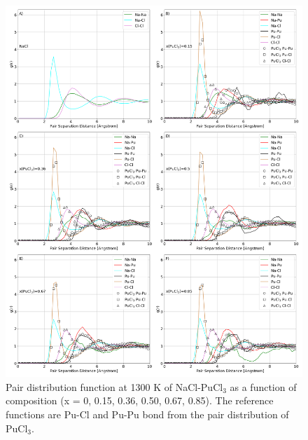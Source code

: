 \documentclass[review]{elsarticle}
\begin{document}
\begin{figure}[h!]
 \centering
 \includegraphics[width=\textwidth]{rdf_comp_to_pucl3.png} 
 \caption{Pair distribution function at 1300 K of NaCl-PuCl$_3$ as a function of composition (x = 0, 0.15, 0.36, 0.50, 0.67, 0.85). The reference functions are Pu-Cl and Pu-Pu bond from the pair distribution of PuCl$_3$. }
 \label{fig:rdf_comp}
\end{figure} 
\end{document}
